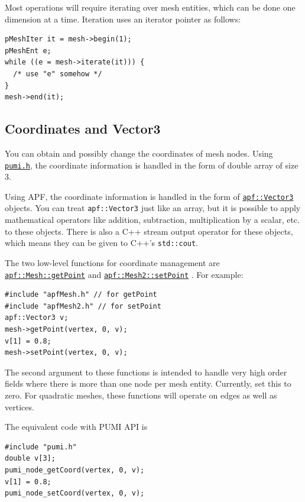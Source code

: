 \documentclass{article}
\begin{document}
{Most operations will require iterating over mesh entities,
which can be done one dimension at a time.
Iteration uses an iterator pointer as follows:

\begin{lstlisting}
pMeshIter it = mesh->begin(1);
pMeshEnt e;
while ((e = mesh->iterate(it))) {
  /* use "e" somehow */
}
mesh->end(it);
\end{lstlisting}

\subsection{Coordinates and Vector3}

You can obtain and possibly change the coordinates of mesh nodes.
Using \href{https://github.com/SCOREC/core/blob/master/pumi/pumi.h}{\texttt{pumi.h}}, the coordinate information is handled in the form of double array of size 3.

Using APF, the coordinate information is handled in the form of
\href{http://scorec.rpi.edu/~dibanez/core/classapf_1_1Vector3.html#_details}{\texttt{apf::Vector3}}
objects.
You can treat \texttt{apf::Vector3} just like an array, but it is
possible to apply mathematical operators like addition, subtraction,
multiplication by a scalar, etc. to these objects.
There is also a C++ stream output operator for these objects, which
means they can be given to C++'s \texttt{std::cout}.

The two low-level functions for coordinate management are
\href{http://scorec.rpi.edu/~dibanez/core/classapf_1_1Mesh.html#a27c491ae08a8248e292179dbd7dacb39}{\texttt{apf::Mesh::getPoint}}
and
\href{http://scorec.rpi.edu/~dibanez/core/classapf_1_1Mesh2.html#a39ad215b2b6d6b75d55819fbbc138f57}{\texttt{apf::Mesh2::setPoint}}
.
For example:

\begin{lstlisting}
#include "apfMesh.h" // for getPoint
#include "apfMesh2.h" // for setPoint
apf::Vector3 v;
mesh->getPoint(vertex, 0, v);
v[1] = 0.8;
mesh->setPoint(vertex, 0, v);
\end{lstlisting}

The second argument to these functions is intended to handle
very high order fields where there is more than one node
per mesh entity.
Currently, set this to zero.
For quadratic meshes, these functions will operate on edges as well as vertices.

The equivalent code with PUMI API is

\begin{lstlisting}
#include "pumi.h"
double v[3];
pumi_node_getCoord(vertex, 0, v);
v[1] = 0.8;
pumi_node_setCoord(vertex, 0, v);
\end{lstlisting}

}
\end{document}
